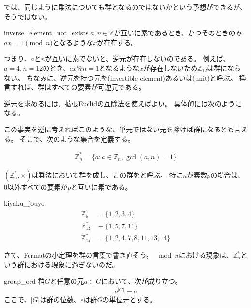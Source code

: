 では、同じように乗法についても群となるのではないかという予想ができるが、そうではない。

\begin{Prop}{}{inverse_element_not_exists}
$a,n\in\mathbb{Z}$が互いに素であるとき、かつそのときのみ$ax=1\pmod{n}$となるような$x$が存在する。
\end{Prop}

つまり、$a$と$n$が互いに素でないと、逆元が存在しないのである。
例えば、$a=4,n=12$のとき、$ax \% n =1$となるような$x$が存在しないため$\mathbb{Z}_{12}$は群にならない。
ちなみに、逆元を持つ元を(invertible element)あるいは(unit)と呼ぶ。
換言すれば、群はすべての要素が可逆元である。

逆元を求めるには、拡張Euclidの互除法を使えばよい。
具体的には次のようになる。


この事実を逆に考えればこのような、単元ではない元を除けば群になるとも言える。
そこで、次のような集合を定義する。

\begin{align*}
\mathbb{Z}_n^* = \{a : a \in \mathbb{Z}_n, \gcd(a,n) = 1\}
\end{align*}

$(\mathbb{Z}_n^*,\times)$は乗法において群を成し、この群をと呼ぶ。
特に$n$が素数$p$の場合は、$0$以外すべての要素が$p$と互いに素である。

\begin{Exam}{}{kiyaku_jouyo}
\begin{align*}
\mathbb{Z}^*_5 &= \{1, 2, 3, 4\}\\
\mathbb{Z}^*_{12} &= \{1, 5, 7, 11\}\\
\mathbb{Z}^*_{15} &= \{1,2,4,7,8,11,13,14\}
\end{align*}
\end{Exam}

さて、Fermatの小定理を群の言葉で書き直そう。
$\bmod{n}$における現象は、$\mathbb{Z}_n^*$という群における現象に過ぎないのだ。

\begin{Theo}{}{group_ord}
群$G$と任意の元$a\in G$において、次が成り立つ。
\begin{align*}
a^{|G|} = e
\end{align*}
ここで、$|G|$は群の位数、$e$は群$G$の単位元とする。
\end{Theo}


